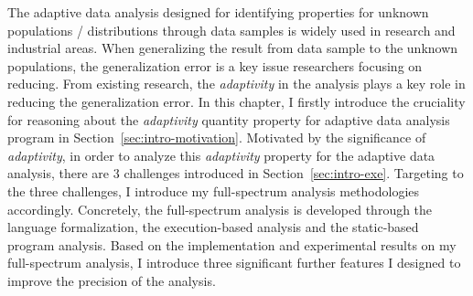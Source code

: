 The adaptive data analysis designed for identifying  properties for unknown populations / distributions 
through data samples is widely 
used in research and industrial areas.
When generalizing the result from data sample to the unknown populations, 
the generalization error is a key issue researchers focusing on reducing.
From existing research, the \emph{adaptivity} in the analysis plays a key role in reducing the generalization error.
In this chapter, 
I firstly introduce the  cruciality for reasoning about the \emph{adaptivity} quantity property 
for adaptive data analysis program in Section~\ref{sec:intro-motivation}.
Motivated by the significance of \emph{adaptivity},
in order to analyze this \emph{adaptivity} property for the adaptive data analysis, there are 3 challenges
introduced in Section~\ref{sec:intro-exe}.
Targeting to the three challenges, I introduce my full-spectrum analysis methodologies accordingly.
Concretely, the full-spectrum analysis is developed through the language formalization,
the execution-based analysis and the static-based program analysis.
%
Based on the implementation and experimental results on my full-spectrum analysis, 
I introduce three significant 
further features I designed to improve the precision of the analysis.
%
